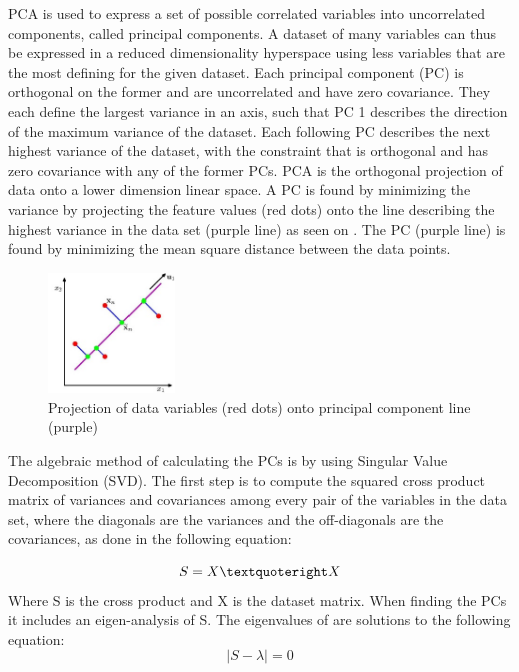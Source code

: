 PCA is used to express a set of possible correlated variables into uncorrelated components, called principal components. A dataset of many variables can thus be expressed in a reduced dimensionality hyperspace using less variables that are the most defining for the given dataset. Each principal component (PC) is orthogonal on the former and are uncorrelated and have zero covariance. They each define the largest variance in an axis, such that PC 1 describes the direction of the maximum variance of the dataset. Each following PC describes the next highest variance of the dataset, with the constraint that is orthogonal and has zero covariance with any of the former PCs.
PCA is the orthogonal projection of data onto a lower dimension linear space. A PC is found by minimizing the variance by projecting the feature values (red dots) onto the line describing the highest variance in the data set (purple line) as seen on . The PC (purple line) is found by minimizing the mean square distance between the data points. 

\begin{figure}[H] 
	\includegraphics[width=0.3\textwidth]{figures/zASP/projection}
	\caption{Projection of data variables (red dots) onto principal component line (purple)}
	\label{projection}
\end{figure}

The algebraic method of calculating the PCs is by using Singular Value Decomposition (SVD). The first step is to compute the squared cross product matrix of variances and covariances among every pair of the variables in the data set, where the diagonals are the variances and the off-diagonals are the covariances, as done in the following equation:

\begin{equation}
S = X \textquoteright X
\end{equation}
Where S is the cross product and X is the dataset matrix. When finding the PCs it includes an eigen-analysis of S. The eigenvalues of are solutions to the following equation:
\begin{equation}
| S - \lambda |  = 0
\end{equation}

